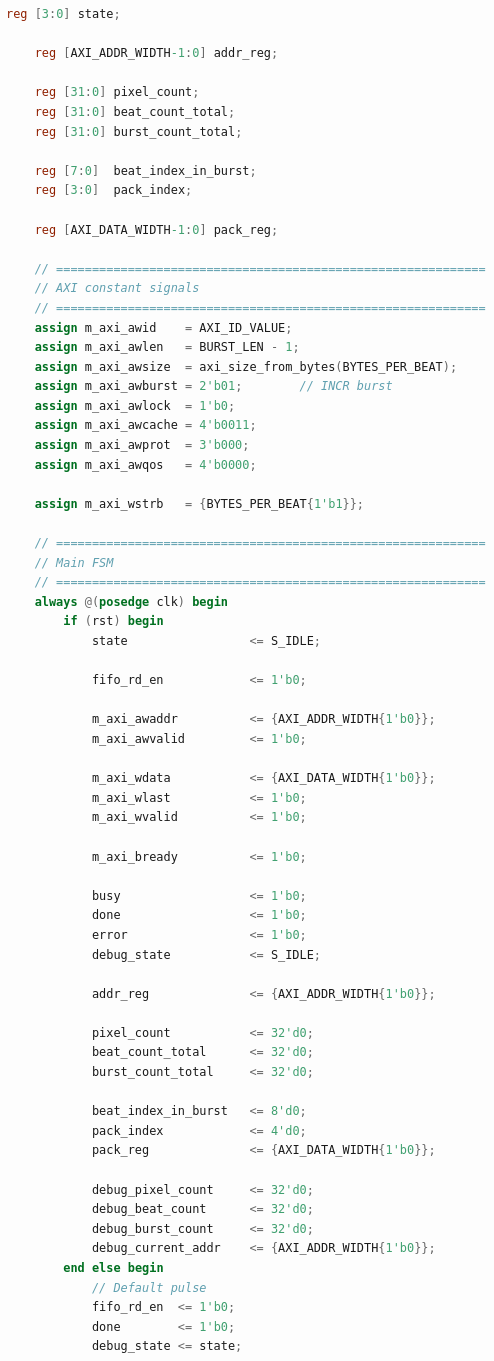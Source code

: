 \begin{lstlisting}[language=Verilog, title={Kode \emph{AXI Write} Yang akan membaca \emph{FIFO Camera} dan menulis ke \emph{DDR3 SDRAM}}, label={code:verilog-axi-write}]
    reg [3:0] state;

    reg [AXI_ADDR_WIDTH-1:0] addr_reg;

    reg [31:0] pixel_count;
    reg [31:0] beat_count_total;
    reg [31:0] burst_count_total;

    reg [7:0]  beat_index_in_burst;
    reg [3:0]  pack_index;

    reg [AXI_DATA_WIDTH-1:0] pack_reg;

    // ============================================================
    // AXI constant signals
    // ============================================================
    assign m_axi_awid    = AXI_ID_VALUE;
    assign m_axi_awlen   = BURST_LEN - 1;
    assign m_axi_awsize  = axi_size_from_bytes(BYTES_PER_BEAT);
    assign m_axi_awburst = 2'b01;        // INCR burst
    assign m_axi_awlock  = 1'b0;
    assign m_axi_awcache = 4'b0011;
    assign m_axi_awprot  = 3'b000;
    assign m_axi_awqos   = 4'b0000;

    assign m_axi_wstrb   = {BYTES_PER_BEAT{1'b1}};

    // ============================================================
    // Main FSM
    // ============================================================
    always @(posedge clk) begin
        if (rst) begin
            state                 <= S_IDLE;

            fifo_rd_en            <= 1'b0;

            m_axi_awaddr          <= {AXI_ADDR_WIDTH{1'b0}};
            m_axi_awvalid         <= 1'b0;

            m_axi_wdata           <= {AXI_DATA_WIDTH{1'b0}};
            m_axi_wlast           <= 1'b0;
            m_axi_wvalid          <= 1'b0;

            m_axi_bready          <= 1'b0;

            busy                  <= 1'b0;
            done                  <= 1'b0;
            error                 <= 1'b0;
            debug_state           <= S_IDLE;

            addr_reg              <= {AXI_ADDR_WIDTH{1'b0}};

            pixel_count           <= 32'd0;
            beat_count_total      <= 32'd0;
            burst_count_total     <= 32'd0;

            beat_index_in_burst   <= 8'd0;
            pack_index            <= 4'd0;
            pack_reg              <= {AXI_DATA_WIDTH{1'b0}};

            debug_pixel_count     <= 32'd0;
            debug_beat_count      <= 32'd0;
            debug_burst_count     <= 32'd0;
            debug_current_addr    <= {AXI_ADDR_WIDTH{1'b0}};
        end else begin
            // Default pulse
            fifo_rd_en  <= 1'b0;
            done        <= 1'b0;
            debug_state <= state;


\end{lstlisting}
